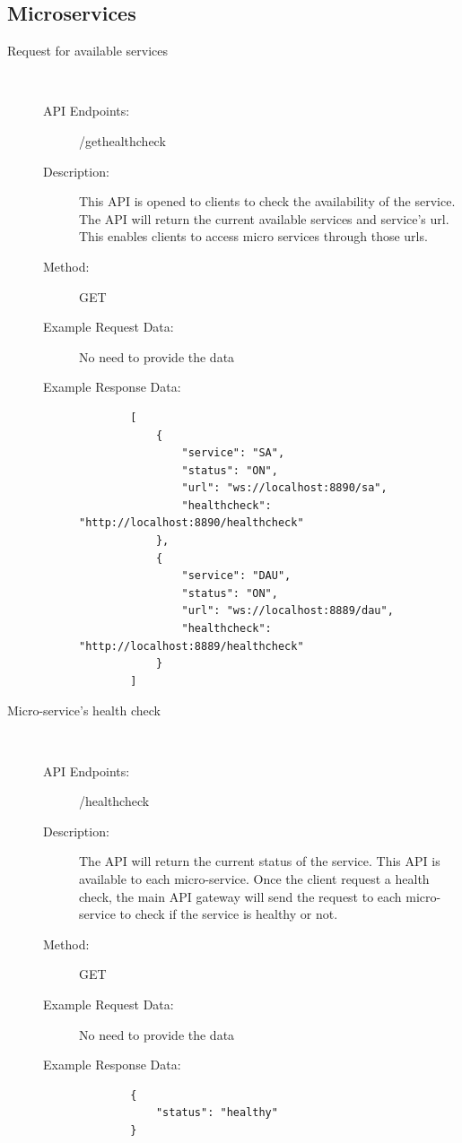 \documentclass[11pt, oneside]{article}   	%
\begin{document}
\subsection{Microservices}
\begin{description}
    \item[Request for available services]
    \
    \begin{description}
        \item[API Endpoints: ] /gethealthcheck
        \item[Description: ] This API is opened to clients to check the availability of the service. The API will return the current available services and service's url. This enables clients to access micro services through those urls.
        \item[Method: ] GET
        \item[Example Request Data: ] No need to provide the data
        \item[Example Response Data: ]
        \begin{verbatim}
        [
            {
                "service": "SA",
                "status": "ON",
                "url": "ws://localhost:8890/sa",
                "healthcheck": "http://localhost:8890/healthcheck"
            },
            {
                "service": "DAU",
                "status": "ON",
                "url": "ws://localhost:8889/dau",
                "healthcheck": "http://localhost:8889/healthcheck"
            }
        ]
        \end{verbatim}
    \end{description}

    \item[Micro-service's health check]
    \
    \begin{description}
        \item[API Endpoints: ] /healthcheck
        \item[Description: ] The API will return the current status of the service. This API is available to each micro-service. Once the client request a health check, the main API gateway will send the request to each micro-service to check if the service is healthy or not.
        \item[Method: ] GET
        \item[Example Request Data: ] No need to provide the data
        \item[Example Response Data: ]
        \begin{verbatim}
        {
            "status": "healthy"
        }
        \end{verbatim}
    \end{description}



\end{description}
\end{document}
